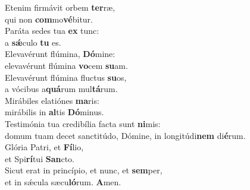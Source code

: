 \evenverse Etenim firmávit orbem \textbf{ter}ræ,~\*\\
\evenverse qui non \textbf{com}mo\textbf{vé}bitur.\\
\oddverse Paráta sedes tua \textbf{ex} tunc:~\*\\
\oddverse a \textbf{sǽ}culo \textbf{tu} es.\\
\evenverse Elevavérunt flúmina, \textbf{Dó}mine:~\*\\
\evenverse elevavérunt flúmina \textbf{vo}cem \textbf{su}am.\\
\oddverse Elevavérunt flúmina fluctus \textbf{su}os,~\*\\
\oddverse a vócibus a\textbf{quá}rum mul\textbf{tá}rum.\\
\evenverse Mirábiles elatiónes \textbf{ma}ris:~\*\\
\evenverse mirábilis in \textbf{al}tis \textbf{Dó}minus.\\
\oddverse Testimónia tua credibília facta sunt \textbf{ni}mis:~\*\\
\oddverse domum tuam decet sanctitúdo, Dómine, in longitúdi\textbf{nem} di\textbf{é}rum.\\
\evenverse Glória Patri, et \textbf{Fí}lio,~\*\\
\evenverse et Spi\textbf{rí}tui \textbf{San}cto.\\
\oddverse Sicut erat in princípio, et nunc, et \textbf{sem}per,~\*\\
\oddverse et in sǽcula sæcu\textbf{ló}rum. \textbf{A}men.\\
